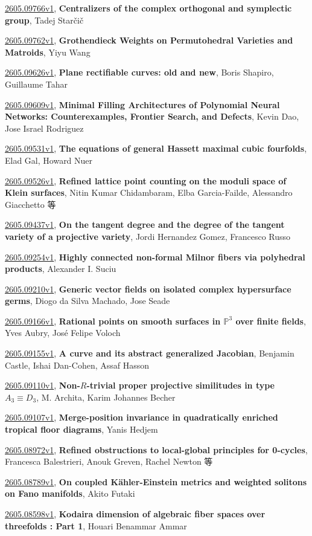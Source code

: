 \documentclass[9pt, a4paper]{article}
\theoremstyle{plain}
\theoremstyle{definition}
\theoremstyle{remark}
\newcommand{\arxiv}[3]{\href{https://arxiv.org/abs/#1}{#1}, \textbf{\textcolor{arxivblue}{#2}}, #3}
\begin{document}
\arxiv{2605.09766v1}{Centralizers of the complex orthogonal and symplectic group}{Tadej Starčič}

\arxiv{2605.09762v1}{Grothendieck Weights on Permutohedral Varieties and Matroids}{Yiyu Wang}

\arxiv{2605.09626v1}{Plane rectifiable curves: old and new}{Boris Shapiro, Guillaume Tahar}

\arxiv{2605.09609v1}{Minimal Filling Architectures of Polynomial Neural Networks: Counterexamples, Frontier Search, and Defects}{Kevin Dao, Jose Israel Rodriguez}

\arxiv{2605.09531v1}{The equations of general Hassett maximal cubic fourfolds}{Elad Gal, Howard Nuer}

\arxiv{2605.09526v1}{Refined lattice point counting on the moduli space of Klein surfaces}{Nitin Kumar Chidambaram, Elba Garcia-Failde, Alessandro Giacchetto 等}

\arxiv{2605.09437v1}{On the tangent degree and the degree of the tangent variety of a projective variety}{Jordi Hernandez Gomez, Francesco Russo}

\arxiv{2605.09254v1}{Highly connected non-formal Milnor fibers via polyhedral products}{Alexander I. Suciu}

\arxiv{2605.09210v1}{Generic vector fields on isolated complex hypersurface germs}{Diogo da Silva Machado, Jose Seade}

\arxiv{2605.09166v1}{Rational points on smooth surfaces in $\mathbb{P}^3$ over finite fields}{Yves Aubry, José Felipe Voloch}

\arxiv{2605.09155v1}{A curve and its abstract generalized Jacobian}{Benjamin Castle, Ishai Dan-Cohen, Assaf Hasson}

\arxiv{2605.09110v1}{Non-$R$-trivial proper projective similitudes in type $A_3\equiv D_3$}{M. Archita, Karim Johannes Becher}

\arxiv{2605.09107v1}{Merge-position invariance in quadratically enriched tropical floor diagrams}{Yanis Hedjem}

\arxiv{2605.08972v1}{Refined obstructions to local-global principles for 0-cycles}{Francesca Balestrieri, Anouk Greven, Rachel Newton 等}

\arxiv{2605.08789v1}{On coupled Kähler-Einstein metrics and weighted solitons on Fano manifolds}{Akito Futaki}

\arxiv{2605.08598v1}{Kodaira dimension of algebraic fiber spaces over threefolds : Part 1}{Houari Benammar Ammar}

\end{document}
